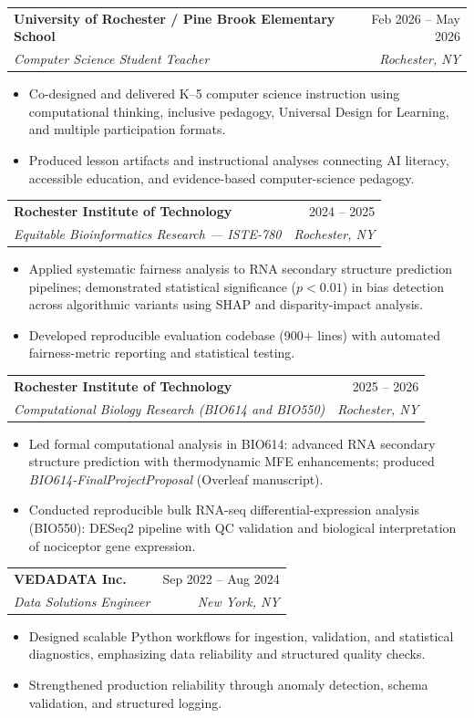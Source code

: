 \documentclass[10pt]{article}
\makeatletter
\newcommand{\entry}[4]{
  \noindent\begin{tabularx}{\textwidth}{@{}Xr@{}}
    \textbf{#1} & #2 \\
    \textit{#3} & \textit{#4}
  \end{tabularx}\vspace{1pt}
}
\makeatother
\begin{document}
\entry{University of Rochester / Pine Brook Elementary School}{Feb 2026 -- May 2026}{Computer Science Student Teacher}{Rochester, NY}
\begin{itemize}
  \item Co-designed and delivered K--5 computer science instruction using computational thinking, inclusive pedagogy, Universal Design for Learning, and multiple participation formats.
  \item Produced lesson artifacts and instructional analyses connecting AI literacy, accessible education, and evidence-based computer-science pedagogy.
\end{itemize}

\entry{Rochester Institute of Technology}{2024 -- 2025}{Equitable Bioinformatics Research --- ISTE-780}{Rochester, NY}
\begin{itemize}
  \item Applied systematic fairness analysis to RNA secondary structure prediction pipelines; demonstrated statistical significance ($p < 0.01$) in bias detection across algorithmic variants using SHAP and disparity-impact analysis.
  \item Developed reproducible evaluation codebase (900+ lines) with automated fairness-metric reporting and statistical testing.
\end{itemize}

\entry{Rochester Institute of Technology}{2025 -- 2026}{Computational Biology Research (BIO614 and BIO550)}{Rochester, NY}
\begin{itemize}
  \item Led formal computational analysis in BIO614: advanced RNA secondary structure prediction with thermodynamic MFE enhancements; produced \textit{BIO614-FinalProjectProposal} (Overleaf manuscript).
  \item Conducted reproducible bulk RNA-seq differential-expression analysis (BIO550): DESeq2 pipeline with QC validation and biological interpretation of nociceptor gene expression.
\end{itemize}

\entry{VEDADATA Inc.}{Sep 2022 -- Aug 2024}{Data Solutions Engineer}{New York, NY}
\begin{itemize}
  \item Designed scalable Python workflows for ingestion, validation, and statistical diagnostics, emphasizing data reliability and structured quality checks.
  \item Strengthened production reliability through anomaly detection, schema validation, and structured logging.
\end{itemize}
\end{document}
